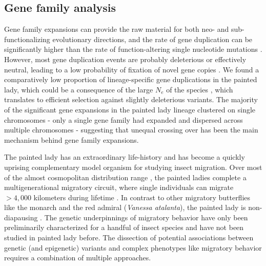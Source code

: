 \documentclass[twocolumn]{bmcart}%
\begin{document}
\subsection*{Gene family analysis}
Gene family expansions can provide the raw material for both neo- and sub-functionalizing evolutionary directions, and the rate of gene duplication can be significantly higher than the rate of function-altering single nucleotide mutations \citep{lipinskiHighSpontaneousRate2011}. However, most gene duplication events are probably deleterious \citep{loehlinExpressionTandemGene2016} or effectively neutral, leading to a low probability of fixation of novel gene copies \citep{emersonNaturalSelectionShapes2008}. We found a comparatively low proportion of lineage-specific gene duplications in the painted lady, which could be a consequence of the large $N_e$ of the species \citep{garcia-berroGenomicDemographicInferenceinprep}, which translates to efficient selection against slightly deleterious variants. The majority of the significant gene expansions in the painted lady lineage clustered on single chromosomes - only a single gene family had expanded and dispersed across multiple chromosomes - suggesting that unequal crossing over has been the main mechanism behind gene family expansions.

The painted lady has an extraordinary life-history and has become a quickly uprising complementary model organism for studying insect migration. Over most of the almost cosmopolitan distribution range \citep{shieldsJournalLepidopteristsSociety1992}, the painted ladies complete a multigenerational migratory circuit, where single individuals can migrate $>4,000$ kilometers during lifetime \citep{talaveraDiscoveryMassMigration2016}. In contrast to other migratory butterflies like the monarch and the red admiral (\textit{Vanessa atalanta}), the painted lady is non-diapausing \citep{shieldsJournalLepidopteristsSociety1992}. The genetic underpinnings of migratory behavior have only been preliminarily characterized for a handful of insect species \citep{kangAnalysisLargescaleGene2004, zhuDefiningBehavioralMolecular2009} and have not been studied in painted lady before. The dissection of potential associations between genetic (and epigenetic) variants and complex phenotypes like migratory behavior requires a combination of multiple approaches. 
\end{document}
